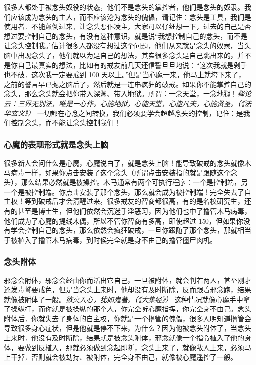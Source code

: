 很多人都处于被念头奴役的状态，他们不是念头的掌控者，他们是念头的奴隶。我们应该成为念头的主人，而不应该沦为念头的傀儡，请记住：念头是工具，我们是使用者，不能颠倒过来，让念头恶仆凌主。大家可以仔细想一下，过去的自己是否想过要控制自己的念头，有没有这种意识，就是说“我想控制自己的念头，而不是让念头控制我。”估计很多人都没有想过这个问题，他们从来就是念头的奴隶，当头脑中出现念头了，他们就以为是自己的想法，其实很多念头是自己跳出来的，并不是你自己最真实的想法，比如有的戒友前几天还信誓旦旦地说：“这次我就是剁手也不破，这次我一定要戒到 100 天以上。”但是当心魔一来，他马上就垮下来了，之前的誓言早已抛之脑后了，然后就是一连串疯狂的破戒。如果你不能掌控自己的念头，那么念头就会把你带入深渊、带入地狱。所谓：一念天堂，一念地狱！\textit{释论云：三界无别法，唯是一心作。心能地狱，心能天堂，心能凡夫，心能贤圣。（《法华玄义》）} 一切都在心念之间转换，我们必须要学会超越念头的控制，记住：是我们控制念头，而不能让念头控制我们！

\subsubsection{心魔的表现形式就是念头上脑}

很多新人会问什么是心魔，心魔说白了，就是念头上脑！能导致破戒的念头就像木马病毒一样，如果你点击安装了这个念头（所谓点击安装指的就是跟随这个念头），那么结果必然就是被操控。木马通常有两个可执行程序：一个是控制端，另一个是被控制端。你点击安装了那个念头，那么就会成为被控制端！完全失去了自主权！等到破戒后才会清醒过来。很多戒友的智商都很高，有的是名校研究生，还有的甚至是博士生，但他们依然会沉迷手淫恶习，因为他们也中了撸管木马病毒，他们成为了心魔的提线木偶，所以不管你智商有多高，即使超过 150，但如果你没有学会控制自己的念头，那么依然会疯狂破戒，一旦你跟随了那个念头，那就相当于被植入了撸管木马病毒，到时候完全就是身不由己的撸管僵尸肉机。

\subsubsection{念头附体}

邪念会附体，邪念会经由你而活出它自己，一旦被附体，就会判若两人，甚至刚才还发毒誓要戒色，但是当念头上来时，他却没有及时断除，反而跟着邪念跑，结果就像被附体了一般。\textit{欲火入心，犹如鬼著。（《大集经》）} 这种情况就像心魔手中拿了操纵杆，而你就是被操纵的那个人，你完全听心魔指挥，你完全身不由己。念头附体后，你就失去了身体的自主权，你就是一个撸管的傀儡，很多人明知道撸管会导致很多身心症状，但是他就是停不下来，为什么？因为他被念头附体了，当念头上来时，他没有及时断除，结果就是被念头附体，邪念就像一个指令植入了他的身体，要做到反植入，那就必须做到念起即断，念头上来了，就像敌人上来，必须马上干掉，否则就会被劫持、被附体，完全身不由己，就像被心魔遥控了一般。

